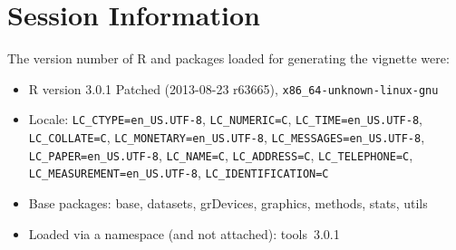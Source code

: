 \documentclass[11pt,a4paper]{article}
\begin{document}


\clearpage

\section*{Session Information}

The version number of R and packages loaded for generating the vignette were:


\begin{itemize}\raggedright
  \item R version 3.0.1 Patched (2013-08-23 r63665), \verb|x86_64-unknown-linux-gnu|
  \item Locale: \verb|LC_CTYPE=en_US.UTF-8|, \verb|LC_NUMERIC=C|, \verb|LC_TIME=en_US.UTF-8|, \verb|LC_COLLATE=C|, \verb|LC_MONETARY=en_US.UTF-8|, \verb|LC_MESSAGES=en_US.UTF-8|, \verb|LC_PAPER=en_US.UTF-8|, \verb|LC_NAME=C|, \verb|LC_ADDRESS=C|, \verb|LC_TELEPHONE=C|, \verb|LC_MEASUREMENT=en_US.UTF-8|, \verb|LC_IDENTIFICATION=C|
  \item Base packages: base, datasets, grDevices, graphics, methods,
    stats, utils
  \item Loaded via a namespace (and not attached): tools~3.0.1
\end{itemize}
\end{document}
